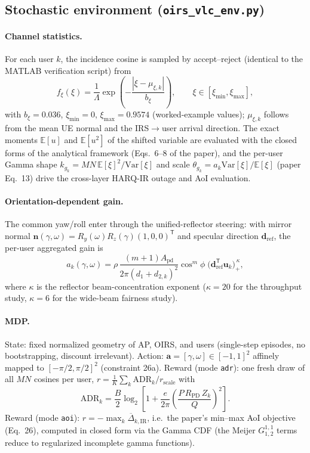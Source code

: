 \documentclass[11pt,a4paper]{article}
\newcommand{\E}{\mathbb{E}}
\begin{document}
\subsection{Stochastic environment (\texttt{oirs\_vlc\_env.py})}
\paragraph{Channel statistics.} For each user $k$, the incidence cosine is
sampled by accept--reject (identical to the MATLAB verification script) from
\begin{equation}
f_\xi(\xi)=\frac{1}{\Lambda}
\exp\!\left(-\frac{|\xi-\mu_{\xi,k}|}{b_\xi}\right),
\qquad \xi\in[\xi_{\min},\xi_{\max}],
\end{equation}
with $b_\xi=0.036$, $\xi_{\min}=0$, $\xi_{\max}=0.9574$ (worked-example
values); $\mu_{\xi,k}$ follows from the mean UE normal and the IRS$\to$user
arrival direction. The exact moments $\E[u]$ and $\E[u^2]$ of the shifted
variable are evaluated with the closed forms of the analytical framework
(Eqs.~6--8 of the paper), and the per-user Gamma shape
$k_{g_k}=MN\,\E[\xi]^2/\mathrm{Var}[\xi]$ and scale
$\theta_{g_k}=a_k\mathrm{Var}[\xi]/\E[\xi]$ (paper Eq.~13) drive the
cross-layer HARQ-IR outage and AoI evaluation.

\paragraph{Orientation-dependent gain.} The common yaw/roll enter through the
unified-reflector steering: with mirror normal
$\mathbf n(\gamma,\omega)=R_y(\omega)R_z(\gamma)(1,0,0)^{\mathsf T}$ and
specular direction $\mathbf d_{\mathrm{ref}}$, the per-user aggregated gain is
\begin{equation}
a_k(\gamma,\omega)=\rho\,\frac{(m+1)A_{\mathrm{pd}}}{2\pi (d_1+d_{2,k})^2}
\cos^m\!\phi\;
\bigl(\mathbf d_{\mathrm{ref}}^{\mathsf T}\mathbf u_k\bigr)_+^{\,\kappa},
\end{equation}
where $\kappa$ is the reflector beam-concentration exponent ($\kappa=20$ for
the throughput study, $\kappa=6$ for the wide-beam fairness study).

\paragraph{MDP.} State: fixed normalized geometry of AP, OIRS, and users
(single-step episodes, no bootstrapping, discount irrelevant). Action:
$\mathbf a=[\gamma,\omega]\in[-1,1]^2$ affinely mapped to
$[-\pi/2,\pi/2]^2$ (constraint 26a). Reward (mode \texttt{adr}): one fresh
draw of all $MN$ cosines per user,
$r=\frac{1}{K}\sum_k \mathrm{ADR}_k / r_{\mathrm{scale}}$ with
\begin{equation}
\mathrm{ADR}_k=\frac{B}{2}\log_2\!\left[1+\frac{e}{2\pi}
\left(\frac{P\,R_{\mathrm{PD}}\,Z_k}{Q}\right)^{2}\right].
\end{equation}
Reward (mode \texttt{aoi}): $r=-\max_k \overline{\Delta}_{k,\mathrm{IR}}$,
i.e.\ the paper's min--max AoI objective (Eq.~26), computed in closed form via
the Gamma CDF (the Meijer $G^{1,1}_{1,2}$ terms reduce to regularized
incomplete gamma functions).
\end{document}
